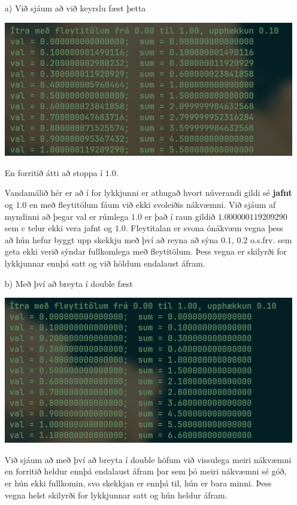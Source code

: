 \documentclass{article}
\begin{document}
	\section{}
	\begin{itemize}
		\item[a)] Við sjáum að við keyrslu fæst þetta
			\begin{center}
				\includegraphics[scale=0.35]{floatloop.png}
			\end{center}

			En forritið átti að stoppa í $1.0$.

			Vandamálið hér er að í for lykkjunni er athugað hvort núverandi 
			gildi sé \textbf{jafnt} og $1.0$ en með fleytitölum fáum við 
			ekki svoleiðis nákvæmni. Við sjáum af myndinni að þegar val er 
			rúmlega $1.0$ er það í raun gildið $1.000000119209290$ sem c 
			telur ekki vera jafnt og $1.0$. Fleytitalan er svona ónákvæm 
			vegna þess að hún hefur byggt upp skekkju með því að reyna að 
			sýna $0.1$, $0.2$ o.s.frv. sem geta ekki verið sýndar fullkomlega 
			með fleytitölum. Þess vegna er skilyrði for 
			lykkjunnar ennþá satt og við höldum endalaust 
			áfram.
		\item[b)] Með því að breyta í double fæst

			\begin{center}
				\includegraphics[scale=0.35]{double.png}
			\end{center}

			Við sjáum að með því að breyta í double höfum við vissulega 
			meiri nákvæmni en forritið heldur ennþá endalaust áfram þar sem 
			þó meiri nákvæmni sé góð, er hún ekki fullkomin, svo skekkjan 
			er ennþá til, hún er bara minni. Þess vegna helst skilyrði for 
			lykkjunnar satt og hún heldur áfram.
	\end{itemize}
\end{document}
